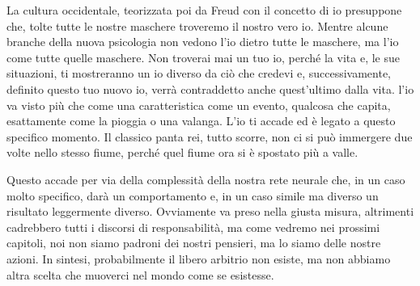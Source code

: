 \documentclass[12pt]{book} %
\begin{document}
La cultura occidentale, teorizzata poi da Freud con il concetto di {\textquotedbl}io{\textquotedbl} presuppone che,
tolte tutte le nostre maschere troveremo il nostro vero io. Mentre alcune branche della nuova psicologia non vedono
l'io dietro tutte le maschere, ma l'io come tutte quelle maschere. Non troverai mai un tuo io, perché la vita e, le sue
situazioni, ti mostreranno un io diverso da ciò che credevi e, successivamente, definito questo tuo nuovo io, verrà
contraddetto anche quest'ultimo dalla vita. l'io va visto più che come una caratteristica come un
evento, qualcosa che capita, esattamente come la pioggia o una valanga. L'io ti accade ed è legato a questo specifico
momento. Il classico panta rei, tutto scorre, non ci si può immergere due volte nello stesso fiume, perché quel fiume
ora si è spostato più a valle.

Questo accade per via della complessità della nostra rete neurale che, in un caso molto specifico, darà un comportamento
e, in un caso simile ma diverso un risultato leggermente diverso. Ovviamente va preso nella giusta misura, altrimenti
cadrebbero tutti i discorsi di responsabilità, ma come vedremo nei prossimi capitoli, noi non siamo padroni dei nostri
pensieri, ma lo siamo delle nostre azioni. In sintesi, probabilmente il libero arbitrio non esiste, ma non abbiamo
altra scelta che muoverci nel mondo come se esistesse.


\bigskip
\end{document}

